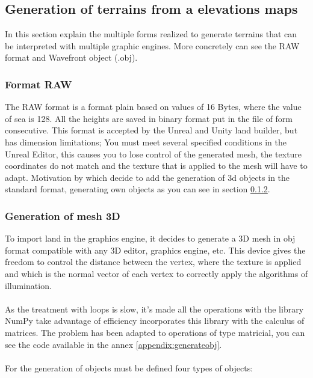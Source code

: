 \documentclass[10pt,a4paper,twocolumn,twoside]{article}
\begin{document}
\subsection{Generation of terrains from a elevations maps}
In this section explain the multiple forms realized to generate terrains that can be interpreted with multiple graphic engines. More concretely can see the RAW format and Wavefront object (.obj).

\subsubsection{Format RAW}

The RAW format is a format plain based on values of 16 Bytes, where the value of sea is 128. All the heights are saved in binary format put in the file of form consecutive. This format is accepted by the Unreal and Unity land builder, but has dimension limitations; You must meet several specified conditions in the Unreal Editor, this causes you to lose control of the generated mesh, the texture coordinates do not match and the texture that is applied to the mesh will have to adapt. Motivation by which decide to add the generation of 3d objects in the standard format, generating own objects as you can see in section \ref{mesh3d}.

\subsubsection{Generation of mesh 3D}
\label{mesh3d}
To import land in the graphics engine, it decides to generate a 3D mesh in obj format compatible with any 3D editor, graphics engine, etc. This device gives the freedom to control the distance between the vertex, where the texture is applied and which is the normal vector of each vertex to correctly apply the algorithms of illumination.
\\
\\
As the treatment with loops is slow, it's made all the operations with the library NumPy take advantage of efficiency incorporates this library with the calculus of matrices. The problem has been adapted to operations of type matricial, you can see the code available in the annex \ref{appendix:generateobj}.
\\
\\
For the generation of objects must be defined four types of objects:
\end{document}

